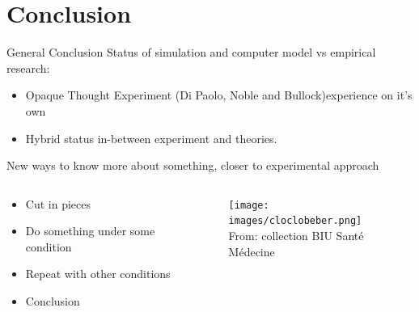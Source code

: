 \documentclass[10pt, notes=show]{beamer}
\begin{document}
\section{Conclusion}

\begin{frame}{General Conclusion}
    Status of simulation and computer model vs empirical research:
    \begin{itemize}
        \item Opaque Thought Experiment (Di Paolo, Noble and Bullock)experience on it's own
        \item Hybrid status in-between experiment and theories.
    \end{itemize}

    \vspace{1cm}

    \textcolor{tracblue}{New ways to know more about something, closer to experimental approach}
    \begin{columns}
        \begin{column}{0.6\linewidth}
            \begin{itemize}
                \item<3-> Cut in pieces
                \item<4-> Do something under some condition
                \item<5-> Repeat with other conditions
                \item<6-> Conclusion
            \end{itemize}
        \end{column}
        \begin{column}{0.3\linewidth}

            {
                \begin{figure}[h]
                    \centering
                    \texttt{[image: images/cloclobeber.png]}\\
                    {\tiny From: collection BIU Santé Médecine}
                \end{figure}
            }
        \end{column}
    \end{columns}
\end{frame}
\end{document}
